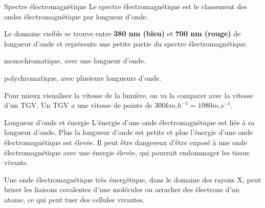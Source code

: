 \begin{doc}{Spectre électromagnétique}
  Le spectre électromagnétique est le classement des ondes électromagnétique par longueur d'onde. 
  \begin{center}
  \end{center}
  Le domaine visible se trouve entre \textbf{380 nm (bleu)} et \textbf{700 nm (rouge)} de longueur d'onde et représente une petite partie du spectre électromagnétique.
\end{doc}


\vspace*{-12pt}
\begin{qcm}
  \item monochromatique, avec une longueur d'onde.
  \item polychromatique, avec plusieurs longueurs d'onde.
\end{qcm}

Pour mieux visualiser la vitesse de la lumière, on va la comparer avec la vitesse d'un TGV.
Un TGV a une vitesse de pointe de $300 \unit{km.h}^{-1} = 1080 \unit{m.s}^{-1}$.
  



\begin{doc}{Longueur d'onde et énergie}
  L'énergie d'une onde électromagnétique est liée à sa longueur d'onde.
  Plus la longueur d'onde est petite et plus l'énergie d'une onde électromagnétique est élevée. 
  Il peut être dangereux d'être exposé à une onde électromagnétique avec une énergie élevée, qui pourrait endommager les tissus vivants.
  
  Une onde électromagnétique très énergétique, dans le domaine des rayons X, peut briser les liaisons covalentes d'une molécules ou arracher des électrons d'un atome, ce qui peut tuer des cellules vivantes.
\end{doc}

